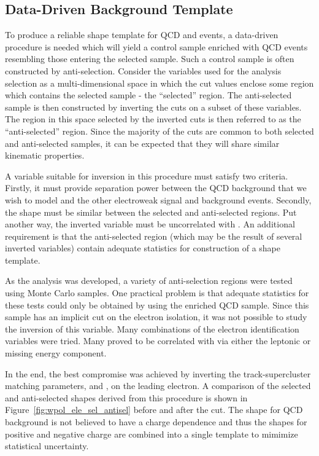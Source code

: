 \subsection{Data-Driven Background Template}
\label{sec:wpol_data_driven_bg}
To produce a reliable \LP shape template for \ac{QCD} and \gammajets events, a
data-driven procedure is needed which will yield a control sample enriched with
\ac{QCD} events resembling those entering the selected sample. Such a control
sample is often constructed by anti-selection. Consider the variables used for
the analysis selection as a multi-dimensional space in which the cut values
enclose some region which contains the selected sample - the ``selected''
region. The anti-selected sample is then constructed by inverting the cuts on a
subset of these variables. The region in this space selected by the inverted
cuts is then referred to as the ``anti-selected'' region. Since the majority of
the cuts are common to both selected and anti-selected samples, it can be
expected that they will share similar kinematic properties.

A variable suitable for inversion in this procedure must satisfy two
criteria. Firstly, it must provide separation power between the \ac{QCD}
background that we wish to model and the other electroweak signal and background
events. Secondly, the \LP shape must be similar between the selected and
anti-selected regions. Put another way, the inverted variable must be
uncorrelated with \LP. An additional requirement is that the anti-selected
region (which may be the result of several inverted variables) contain adequate
statistics for construction of a shape template.

As the analysis was developed, a variety of anti-selection regions were tested
using Monte Carlo samples. One practical problem is that adequate statistics for
these tests could only be obtained by using the enriched \ac{QCD} sample. Since
this sample has an implicit cut on the electron isolation, it was not possible
to study the inversion of this variable. Many combinations of the electron
identification variables were tried. Many proved to be correlated with \LP via
either the leptonic or missing energy component.

In the end, the best compromise was achieved by inverting the track-supercluster
matching parameters, \deltaetain and \deltaphiin, on the leading electron. A
comparison of the selected and anti-selected shapes derived from this procedure
is shown in Figure~\ref{fig:wpol_ele_sel_antisel} before and after the \MT
cut. The \LP shape for \ac{QCD} background is not believed to have a charge
dependence and thus the shapes for positive and negative charge are combined
into a single template to mimimize statistical uncertainty.


